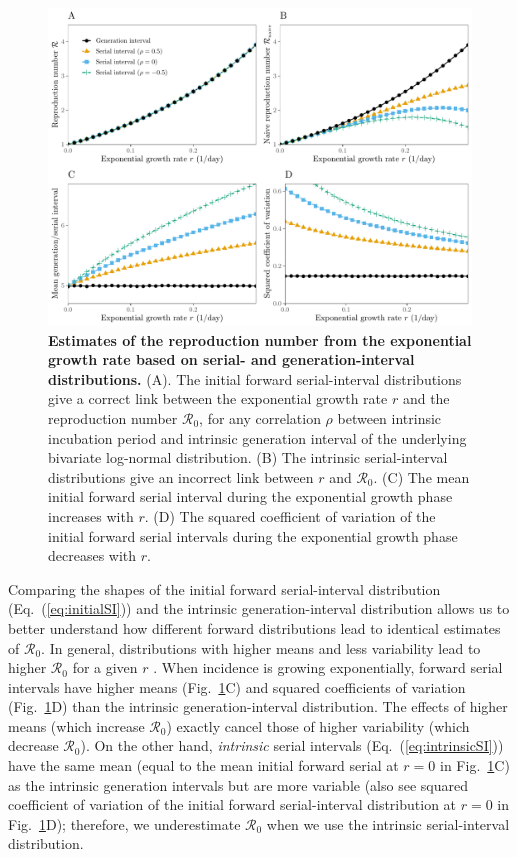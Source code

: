 \documentclass[12pt]{article}
\newcommand{\eref}[1]{Eq.~(\ref{eq:#1})}
\newcommand{\fref}[1]{Fig.~\ref{fig:#1}}
\newcommand{\Rx}[1]{\ensuremath{{\mathcal R}_{#1}}\xspace}
\newcommand{\Ro}{\Rx{0}}
\begin{document}
\begin{figure}[!th]
\includegraphics[width=\textwidth]{rR.pdf}
\caption{
\textbf{Estimates of the reproduction number from the exponential growth rate based on serial- and generation-interval distributions.}
(A). The initial forward serial-interval distributions give a correct
link between the exponential growth rate $r$ and the reproduction
number \Ro,
for any correlation $\rho$ between intrinsic incubation period and
intrinsic generation interval of the underlying bivariate log-normal distribution.
(B) The intrinsic serial-interval distributions give an incorrect link between $r$ and \Ro.
(C) The mean initial forward serial interval during the exponential growth phase increases with $r$.
(D) The squared coefficient of variation of the initial forward serial intervals during the exponential growth phase decreases with $r$.
}
\label{fig:rR}
\end{figure}

Comparing the shapes of the initial forward serial-interval distribution (\eref{initialSI}) and the intrinsic generation-interval distribution allows us to better understand how different forward distributions lead to identical estimates of \Ro.
In general, distributions with higher means and less variability lead to higher \Ro for a given $r$ \citep{wallinga2007generation, weitz2015modeling, park2019practical}.
When incidence is growing exponentially, forward serial intervals have higher means (\fref{rR}C) and squared coefficients of variation (\fref{rR}D) than the intrinsic generation-interval distribution.
The effects of higher means (which increase \Ro) exactly cancel those of higher variability (which decrease \Ro).
On the other hand, \emph{intrinsic} serial intervals (\eref{intrinsicSI}) have the same mean (equal to the mean initial forward serial at $r=0$ in \fref{rR}C) as the intrinsic generation intervals but are more variable (also see squared coefficient of variation of the initial forward serial-interval distribution at $r=0$ in \fref{rR}D); 
therefore, we underestimate \Ro when we use the intrinsic serial-interval distribution.
\end{document}
